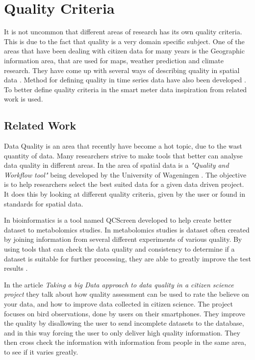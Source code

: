 \section{Quality Criteria}
It is not uncommon that different areas of research has its own quality criteria. This is due to the fact that quality is a very domain specific subject. One of the areas that have been dealing with citizen data for many years is the Geographic information area, that are used for maps, weather prediction and climate research. They have come up with several ways of describing quality in spatial data \cite{RefWorks:7}. Method for defining quality in time series data have also been developed  \cite{RefWorks:6}. To better define quality criteria in the smart meter data inspiration from related work is used.

\subsection{Related Work}
Data Quality is an area that recently have become a hot topic, due to the wast quantity of data. Many researchers strive to make tools that better can analyse data quality in different areas. In the area of spatial data is a \emph{"Quality and Workflow tool"} being developed by the University of Wageningen \citep{RefWorks:8}. The objective is to help researchers select the best suited data for a given data driven project. It does this by looking at different quality criteria, given by the user or found in standards for spatial data. 

In bioinformatics is a tool named QCScreen developed to help create better dataset to metabolomics studies. In metabolomics studies is dataset often created by joining information from several different experiments of various quality. By using tools that can check the data quality and consistency to determine if a dataset is suitable for further processing, they are able to greatly improve the test results \citep{RefWorks:9}.
 
In the article \emph{Taking a big Data approach to data quality in a citizen science project}\citep{RefWorks:2} they talk about how quality assessment can be used to rate the 
believe on your data, and how to improve data collected in citizen science. The project focuses on bird observations, done by users on their smartphones. They improve the quality by disallowing the user to send incomplete datasets to the database, and in this way forcing the user to only deliver high quality information. They then cross check the information with information from people in the same area, to see if it varies greatly. 

